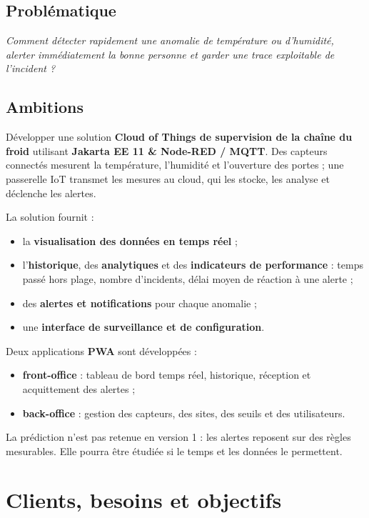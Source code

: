 \documentclass[11pt,a4paper]{article}
\let\oldsection\section
\renewcommand{\section}{\Needspace{10\baselineskip}\oldsection}
\newcommand{\encadre}[1]{\par\textit{#1}\par}
\begin{document}
\subsection{Problématique}
\encadre{Comment détecter rapidement une anomalie de température ou d'humidité, alerter
immédiatement la bonne personne et garder une trace exploitable de l'incident ?}

\subsection{Ambitions}
Développer une solution \textbf{Cloud of Things de supervision de la chaîne du froid}
utilisant \textbf{Jakarta EE 11 \& Node-RED / MQTT}. Des capteurs connectés mesurent la
température, l'humidité et l'ouverture des portes ; une passerelle IoT transmet les mesures
au cloud, qui les stocke, les analyse et déclenche les alertes.

La solution fournit :
\begin{itemize}
  \item la \textbf{visualisation des données en temps réel} ;
  \item l'\textbf{historique}, des \textbf{analytiques} et des \textbf{indicateurs de performance} :
        temps passé hors plage, nombre d'incidents, délai moyen de réaction à une alerte ;
  \item des \textbf{alertes et notifications} pour chaque anomalie ;
  \item une \textbf{interface de surveillance et de configuration}.
\end{itemize}

Deux applications \textbf{PWA} sont développées :
\begin{itemize}
  \item \textbf{front-office} : tableau de bord temps réel, historique, réception et acquittement des alertes ;
  \item \textbf{back-office} : gestion des capteurs, des sites, des seuils et des utilisateurs.
\end{itemize}
La prédiction n'est pas retenue en version 1 : les alertes reposent sur des règles
mesurables. Elle pourra être étudiée si le temps et les données le permettent.

\section{Clients, besoins et objectifs}
\end{document}
